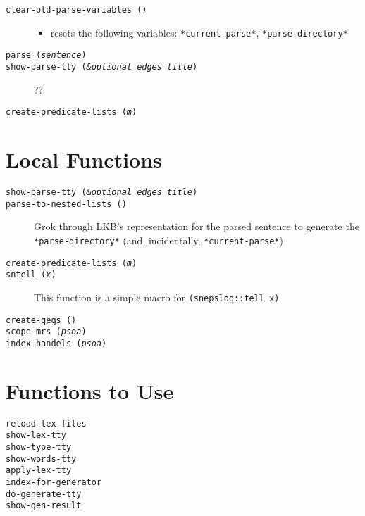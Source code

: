 \documentclass{article}
\newcommand{\com}[1]{\texttt{#1}}
\newcommand{\var}[1]{\texttt{#1}}
\newcommand{\val}[1]{\texttt{\textsl{#1}}}
\begin{document}
  \begin{description}
    \item[\com{clear-old-parse-variables ()}] \rule{0pt}{0pt}
      \begin{itemize}
        \item resets the following variables:  \var{*current-parse*}, \var{*parse-directory*}
      \end{itemize}
    \item[\com{parse (\val{sentence})}]
    \item[\com{show-parse-tty (\val{\&optional edges title})}] ??
    \item[\com{create-predicate-lists (\val{m})}]
  \end{description}

\section{Local Functions}

  \begin{description}
    \item[\com{show-parse-tty (\val{\&optional edges title})}]
    \item[\com{parse-to-nested-lists ()}] Grok through LKB's representation for the parsed sentence to generate the \var{*parse-directory*} (and, incidentally, \var{*current-parse*})
    \item[\com{create-predicate-lists (\val{m})}]
    \item[\com{sntell (\val{x})}] This function is a simple macro for \com{(snepslog::tell x)}
    \item[\com{create-qeqs ()}]
    \item[\com{scope-mrs (\val{psoa})}]
    \item[\com{index-handels (\val{psoa})}]
  \end{description}

\section{Functions to Use}

  \begin{description}
    \item[\com{reload-lex-files}]
    \item[\com{show-lex-tty}]
    \item[\com{show-type-tty}]
    \item[\com{show-words-tty}]
    \item[\com{apply-lex-tty}]
    \item[\com{index-for-generator}]
    \item[\com{do-generate-tty}]
    \item[\com{show-gen-result}]
  \end{description}
\end{document}
